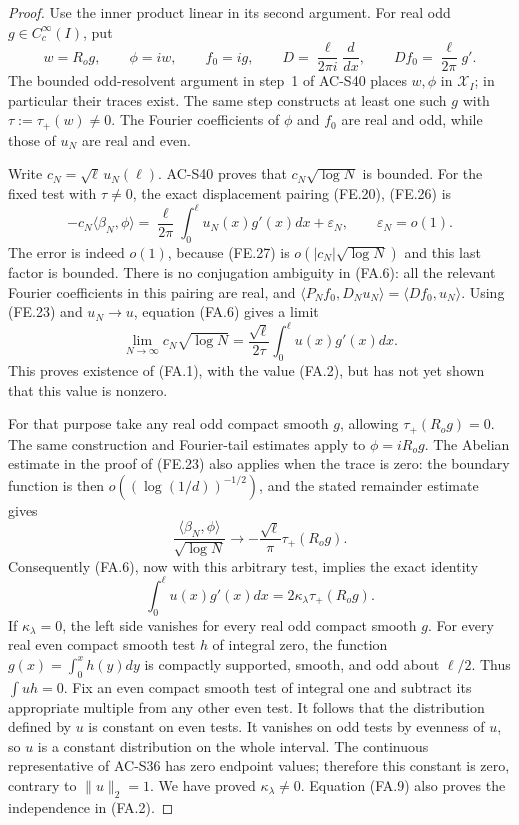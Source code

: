\begin{proof}
Use the inner product linear in its second argument.
For real odd \(g\in C_c^\infty(I)\), put
\[
 w=R_og,\qquad \phi=iw,\qquad f_0=ig,
 \qquad D=\frac{\ell}{2\pi i}\frac{d}{dx},
 \qquad Df_0=\frac{\ell}{2\pi}g'.                         \tag{FA.5}
\]
The bounded odd-resolvent argument in step~1 of AC-S40 places
\(w,\phi\) in \(\mathcal X_I\); in particular their traces exist.
The same step constructs at least one such \(g\) with
\(\tau:=\tau_+(w)\ne0\).
The Fourier coefficients of \(\phi\) and \(f_0\) are real and
odd, while those of \(u_N\) are real and even.

Write \(c_N=\sqrt\ell\,u_N(\ell)\).
AC-S40 proves that \(c_N\sqrt{\log N}\) is bounded.
For the fixed test with \(\tau\ne0\), the exact displacement
pairing (FE.20), (FE.26) is
\[
 -c_N\langle\beta_N,\phi\rangle
   =\frac{\ell}{2\pi}\int_0^\ell u_N(x)g'(x)dx+\varepsilon_N,
                    \qquad \varepsilon_N=o(1).            \tag{FA.6}
\]
The error is indeed \(o(1)\), because (FE.27) is
\(o(|c_N|\sqrt{\log N})\) and this last factor is bounded.
There is no conjugation ambiguity in (FA.6): all the relevant
Fourier coefficients in this pairing are real, and
\(\langle P_N f_0,D_Nu_N\rangle
 =\langle Df_0,u_N\rangle\).
Using (FE.23) and \(u_N\to u\), equation (FA.6) gives a limit
\[
 \lim_{N\to\infty}c_N\sqrt{\log N}
   =\frac{\sqrt\ell}{2\tau}\int_0^\ell u(x)g'(x)dx.
                                                        \tag{FA.7}
\]
This proves existence of (FA.1), with the value (FA.2),
but has not yet shown that this value is nonzero.

For that purpose take any real odd compact smooth \(g\), allowing
\(\tau_+(R_og)=0\).  The same construction and Fourier-tail
estimates apply to \(\phi=iR_og\).
The Abelian estimate in the proof of (FE.23) also applies when
the trace is zero: the boundary function is then
\(o((\log(1/d))^{-1/2})\), and the stated remainder estimate
gives
\[
 \frac{\langle\beta_N,\phi\rangle}{\sqrt{\log N}}
           \longrightarrow-\frac{\sqrt\ell}{\pi}
                                         \tau_+(R_og).
                                                        \tag{FA.8}
\]
Consequently (FA.6), now with this arbitrary test, implies
the exact identity
\[
              \int_0^\ell u(x)g'(x)dx
                        =2\kappa_\lambda\tau_+(R_og).
                                                        \tag{FA.9}
\]
If \(\kappa_\lambda=0\), the left side vanishes for every
real odd compact smooth \(g\).
For every real even compact smooth test \(h\) of integral zero,
the function \(g(x)=\int_0^x h(y)dy\) is compactly supported,
smooth, and odd about \(\ell/2\).  Thus \(\int uh=0\).
Fix an even compact smooth test of integral one and subtract its
appropriate multiple from any other even test.
It follows that the distribution defined by \(u\) is constant
on even tests.  It vanishes on odd tests by evenness of \(u\),
so \(u\) is a constant distribution on the whole interval.
The continuous representative of AC-S36 has zero endpoint values;
therefore this constant is zero, contrary to \(\|u\|_2=1\).
We have proved \(\kappa_\lambda\ne0\).
Equation (FA.9) also proves the independence in (FA.2).


\end{proof}

